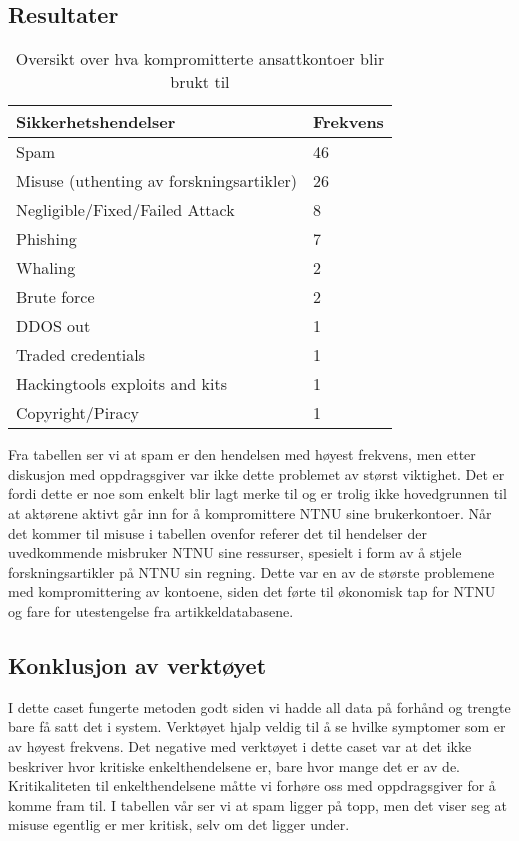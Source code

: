 \subsection{Resultater}
\begin{table} [H]
    \begin{tabular}{ | m{18em} | m{18em} | }
        \hline
            \cellcolor{yellow} Sikkerhetshendelser & \cellcolor{yellow} Frekvens \\
        \hline
            Spam & 46  \\
        \hline
            Misuse (uthenting av forskningsartikler) & 26 \\
        \hline
            Negligible/Fixed/Failed Attack  & 8 \\
        \hline
            Phishing & 7 \\
        \hline
            Whaling & 2 \\
        \hline
            Brute force & 2 \\
        \hline
            DDOS out & 1 \\
        \hline
            Traded credentials & 1 \\
        \hline
            Hackingtools exploits and kits & 1 \\
        \hline
            Copyright/Piracy & 1 \\
        \hline
    \end{tabular}
    \caption{Oversikt over hva kompromitterte ansattkontoer blir brukt til}
    \label{kritisk_tabell_2}
\end{table}

Fra tabellen ser vi at spam er den hendelsen med høyest frekvens, men etter diskusjon med oppdragsgiver var ikke dette problemet av størst viktighet. Det er fordi dette er noe som enkelt blir lagt merke til og er trolig ikke hovedgrunnen til at aktørene aktivt går inn for å kompromittere NTNU sine brukerkontoer. Når det kommer til misuse i tabellen ovenfor referer det til hendelser der uvedkommende misbruker NTNU sine ressurser, spesielt i form av å stjele forskningsartikler på NTNU sin regning. Dette var en av de største problemene med kompromittering av kontoene, siden det førte til økonomisk tap for NTNU og fare for utestengelse fra artikkeldatabasene. 


\subsection{Konklusjon av verktøyet}
I dette caset fungerte metoden godt siden vi hadde all data på forhånd og trengte bare få satt det i system. Verktøyet hjalp veldig til å se hvilke symptomer som er av høyest frekvens. Det negative med verktøyet i dette caset var at det ikke beskriver hvor kritiske enkelthendelsene er, bare hvor mange det er av de. Kritikaliteten til enkelthendelsene måtte vi forhøre oss med oppdragsgiver for å komme fram til. I tabellen vår ser vi at spam ligger på topp, men det viser seg at misuse egentlig er mer kritisk, selv om det ligger under. 





